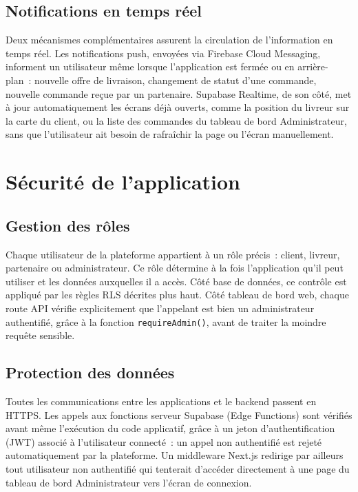\documentclass[12pt,fleqn,a4paper]{report}
\begin{document}
\begin{justify}
\subsection{Notifications en temps réel}

Deux mécanismes complémentaires assurent la circulation de l'information en temps réel. Les notifications push, envoyées via Firebase Cloud Messaging, informent un utilisateur même lorsque l'application est fermée ou en arrière-plan~: nouvelle offre de livraison, changement de statut d'une commande, nouvelle commande reçue par un partenaire. Supabase Realtime, de son côté, met à jour automatiquement les écrans déjà ouverts, comme la position du livreur sur la carte du client, ou la liste des commandes du tableau de bord Administrateur, sans que l'utilisateur ait besoin de rafraîchir la page ou l'écran manuellement.

\section{Sécurité de l'application}

\subsection{Gestion des rôles}

Chaque utilisateur de la plateforme appartient à un rôle précis~: client, livreur, partenaire ou administrateur. Ce rôle détermine à la fois l'application qu'il peut utiliser et les données auxquelles il a accès. Côté base de données, ce contrôle est appliqué par les règles RLS décrites plus haut. Côté tableau de bord web, chaque route API vérifie explicitement que l'appelant est bien un administrateur authentifié, grâce à la fonction \texttt{requireAdmin()}, avant de traiter la moindre requête sensible.

\subsection{Protection des données}

Toutes les communications entre les applications et le backend passent en HTTPS. Les appels aux fonctions serveur Supabase (Edge Functions) sont vérifiés avant même l'exécution du code applicatif, grâce à un jeton d'authentification (JWT) associé à l'utilisateur connecté~: un appel non authentifié est rejeté automatiquement par la plateforme. Un middleware Next.js redirige par ailleurs tout utilisateur non authentifié qui tenterait d'accéder directement à une page du tableau de bord Administrateur vers l'écran de connexion.


\end{justify}
\end{document}

